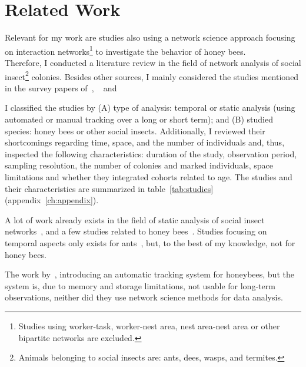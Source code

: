 \chapter{Related Work}
\label{ch:relatedwork}

Relevant for my work are studies also using a network science approach focusing on interaction networks\footnote{Studies using worker-task, worker-nest area, nest area-nest area or other bipartite networks are excluded.} to investigate the behavior of honey bees.\\
Therefore, I conducted a literature review in the field of network analysis of social insect\footnote{Animals belonging to social insects are: ants, dees, wasps, and termites.} colonies.
Besides other sources, I mainly considered the studies mentioned in the survey papers of~\textcite{Pinter-Wollman2014}, ~\textcite[chapter~15]{krause2014animal} and~\textcite{charbonneau2013social}

I classified the studies by (A) type of analysis: temporal or static analysis (using automated or manual tracking over a long or short term); and (B) studied species: honey bees or other social insects.
Additionally, I reviewed their shortcomings regarding time, space, and the number of individuals and, thus, inspected the following characteristics: duration of the study, observation period, sampling resolution, the number of colonies and marked individuals, space limitations and whether they integrated cohorts related to age. The studies and their characteristics are summarized in table~\ref{tab:studies} (appendix~\ref{ch:appendix}).

A lot of work already exists in the field of static analysis of social insect networks~\cite{greenwald2015ant,pinter2011effect,otterstatter2007contact,quevillon2015social,naug2009structure,formica2012fitness,waters2012information,sendova2010emergency}, and a few studies related to honey bees~\cite{baracchi2014socio,naug2008structure,scholl2011olfactory,naug2007experimentally}.
Studies focusing on temporal aspects only exists for ants~\cite{mersch2013tracking,blonder2011time,jeanson2012long}, but, to the best of my knowledge, not for honey bees.

The work by~\textcite{kimura2011new}, introducing an automatic tracking system for honeybees, but the system is, due to memory and storage limitations, not usable for long-term observations, neither did they use network science methods for data analysis.

